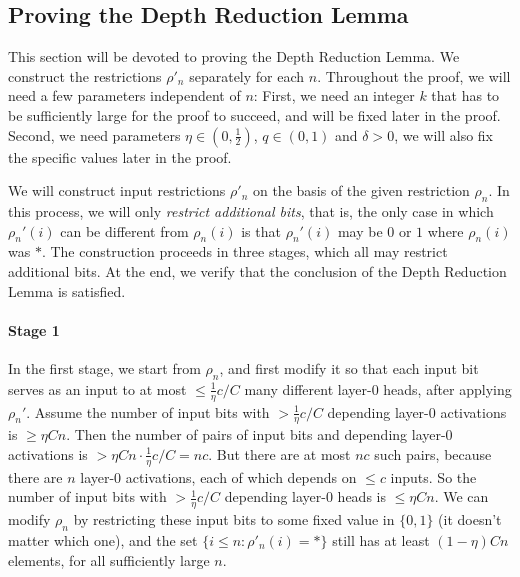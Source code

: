 \documentclass[11pt,a4paper]{article}
\begin{document}


\subsection{Proving the Depth Reduction Lemma}
This section will be devoted to proving the Depth Reduction Lemma.
We construct the restrictions $\rho'_n$ separately for each $n$.
Throughout the proof, we will need a few parameters independent of $n$: First, we need an integer $k$ that has to be sufficiently large for the proof to succeed, and will be fixed later in the proof.
Second, we need parameters $\eta \in (0, \frac{1}{2})$, $q \in (0,1)$ and $\delta > 0$, we will also fix the specific values later in the proof.

We will construct input restrictions $\rho'_n$ on the basis of the given restriction $\rho_n$.
In this process, we will only \emph{restrict additional bits}, that is, the only case in which $\rho_n'(i)$ can be different from $\rho_n(i)$ is that $\rho_n'(i)$ may be $0$ or $1$ where $\rho_n(i)$ was $*$.
The construction proceeds in three stages, which all may restrict additional bits.
At the end, we verify that the conclusion of the Depth Reduction Lemma is satisfied.

\paragraph{Stage 1}
In the first stage, we start from $\rho_n$, and first modify it so that each input bit serves as an input to at most $\leq \frac{1}{\eta} c/C$ many different layer-0 heads, after applying $\rho_n'$.
Assume the number of input bits with $> \frac{1}{\eta} c/C$ depending layer-0 activations is $\geq \eta Cn$.
Then the number of pairs of input bits and depending layer-0 activations is $>\eta Cn \cdot \frac{1}{\eta} c/C = nc$.
But there are at most $nc$ such pairs, because there are $n$ layer-0 activations, each of which depends on $\leq c$ inputs.
So the number of input bits with $> \frac{1}{\eta} c/C$ depending layer-0 heads is $\leq \eta Cn$.
We can modify $\rho_n$ by restricting these input bits to some fixed value in $\{0, 1\}$ (it doesn't matter which one), and the set $\{i \leq n: \rho'_n(i) = *\}$ still has at least $(1-\eta) C n$ elements, for all sufficiently large $n$.
\end{document}
